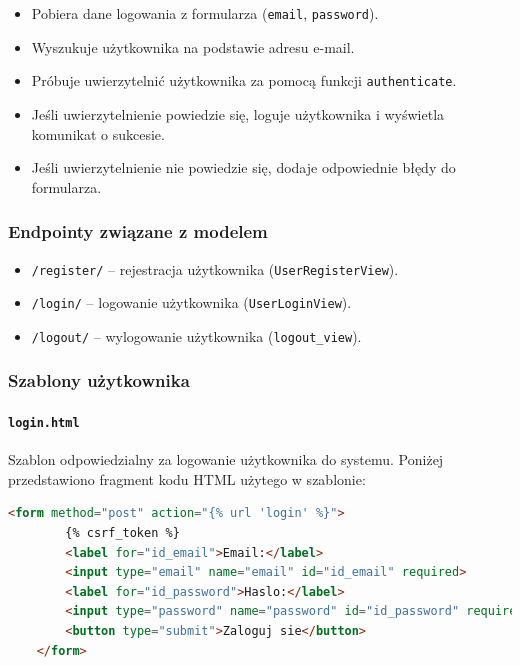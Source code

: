 \documentclass[12pt,a4paper,oneside]{article}
\theoremstyle{definition}
\numberwithin{equation}{section}
\begin{document}
\begin{itemize}
\begin{itemize}
\begin{itemize}
            \begin{itemize}
                \item Pobiera dane logowania z formularza (\texttt{email}, \texttt{password}).
                \item Wyszukuje użytkownika na podstawie adresu e-mail.
                \item Próbuje uwierzytelnić użytkownika za pomocą funkcji \texttt{authenticate}.
                \item Jeśli uwierzytelnienie powiedzie się, loguje użytkownika i wyświetla komunikat o sukcesie.
                \item Jeśli uwierzytelnienie nie powiedzie się, dodaje odpowiednie błędy do formularza.
            \end{itemize}
        \end{itemize}
    \end{itemize}
\end{itemize}


\subsubsection*{Endpointy związane z modelem}

\begin{itemize}
    \item \texttt{/register/} – rejestracja użytkownika (\texttt{UserRegisterView}).
    \item \texttt{/login/} – logowanie użytkownika (\texttt{UserLoginView}).
    \item \texttt{/logout/} – wylogowanie użytkownika (\texttt{logout\_view}).
\end{itemize}

\subsubsection*{Szablony użytkownika}
\label{sec:user_templates}

\paragraph{\texttt{login.html}}
\label{sec:login_template}

Szablon odpowiedzialny za logowanie użytkownika do systemu. Poniżej przedstawiono fragment kodu HTML użytego w szablonie:

\begin{lstlisting}[language=HTML, caption=Szablon login.html]
    <form method="post" action="{% url 'login' %}">
        {% csrf_token %}
        <label for="id_email">Email:</label>
        <input type="email" name="email" id="id_email" required>
        <label for="id_password">Haslo:</label>
        <input type="password" name="password" id="id_password" required>
        <button type="submit">Zaloguj sie</button>
    </form>
\end{lstlisting}
\end{document}
